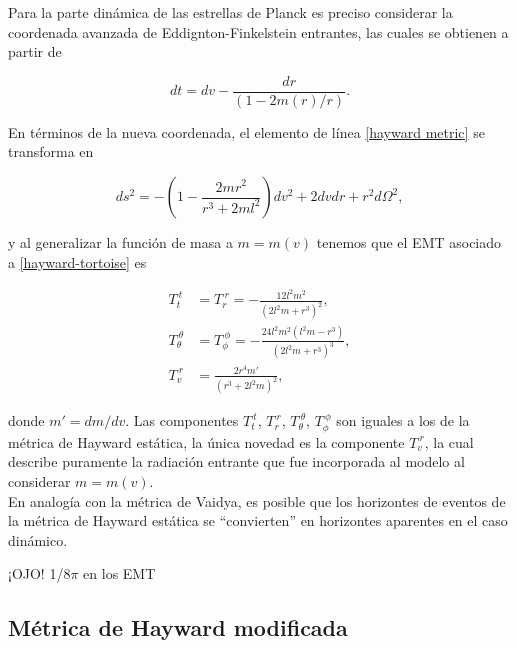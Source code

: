 \documentclass{article}
\numberwithin{equation}{section}
\theoremstyle{definition}
\begin{document}
Para la parte dinámica de las estrellas de Planck es preciso considerar la coordenada avanzada de Eddignton-Finkelstein entrantes, las cuales se obtienen a partir de

\begin{equation}
dt = dv - \frac{dr}{(1 - 2m(r)/r)}.
\end{equation}

En términos de la nueva coordenada, el elemento de línea \eqref{hayward metric} se transforma en 

\begin{equation}
\label{hayward-tortoise}
ds^2 = -\left( 1 - \frac{2mr^2}{r^3 + 2ml^2} \right) dv^2 + 2dvdr + r^2d\Omega ^2,
\end{equation}

y al generalizar la función de masa a $m = m(v)$ tenemos que el EMT asociado a \eqref{hayward-tortoise} es

\begin{equation}
\begin{aligned}
T_{t}^{\ t} &= T_{r}^{\ r} = -\frac{12 l^2 m^2}{\left(2 l^2 m+r^3\right)^2}, \\
T_{\theta}^{\ \theta} &= T_{\phi}^{\ \phi} = -\frac{24 l^2 m^2 \left(l^2 m-r^3\right)}{\left(2 l^2 m+r^3\right)^3},\\
T_{v}^{\ r} &= \frac{2r^4m'}{(r^3 + 2l^2m)^2},
\end{aligned}
\end{equation}

donde $m' = dm/dv$. Las componentes $T_{t}^{\ t}$, $T_{r}^{\ r}$, $T_{\theta}^{\ \theta}$, $T_{\phi}^{\ \phi}$ son iguales a los de la métrica de Hayward estática, la única novedad es la componente $T_{v}^{\ r}$, la cual describe puramente la radiación entrante que fue incorporada al modelo al considerar $m = m(v)$.\\

En analogía con la métrica de Vaidya, es posible que los horizontes de eventos de la métrica de Hayward estática se ``convierten'' en horizontes aparentes en el caso dinámico. 

¡OJO! 1/8$\pi$ en los EMT

\subsection{Métrica de Hayward modificada}
\end{document}
